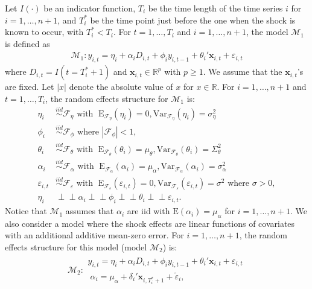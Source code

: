 \documentclass[11pt]{article}
\newcommand{\R}{\mathbb{R}}
\newcommand{\x}{\textbf{x}}
\def\mbf#1{\mathbf{#1}} %
\newcommand{\simiid}{\stackrel{iid}{\sim}} %
\def\where{\text{ where }} %
\newcommand{\indep}{\perp \!\!\! \perp } %
\def\mrm#1{\mathrm{#1}} %
\newcommand{\reals}{\mathbb{R}} %
\def\t#1{\tilde{#1}} %
\def\mc#1{\mathcal{#1}} %
\def\E#1{\mathrm{E}(#1)} %
\theoremstyle{definition}
\begin{document}
Let $I(\cdot)$ be an indicator function, $T_i$ be the time length of the time series $i$ for $i = 1, \ldots, n+1$, and $T_i^*$ be the time point just before the one when the shock is known to occur, with $T_i^* < T_i$.  For $t= 1, \ldots, T_i$ and $i = 1, \ldots, n+1$, the model $\mc{M}_1$ is defined as
\begin{align}
\mc{M}_1 \colon y_{i,t} =\eta_i +\alpha_i D_{i,t} + \phi_i y_{i, t-1} + \theta_i'\mbf{x}_{i,t} + \varepsilon_{i,t}\label{equation1}
\end{align}
 where $D_{i,t} = I(t = T_i^* + 1)$ 
and $\x_{i,t} \in \R^{p}$ with $p \geq 1$.  We assume that the 
$\mbf{x}_{i,t}$'s are fixed. Let $|x|$ denote the absolute value of $x$ for $x\in \reals$. For $i = 1, \ldots, n+1$ and $t=1, \ldots, T_i$, the random effects structure for $\mc{M}_1$ is:
\begin{align*}
  \eta_i &\simiid \mc{F}_{\eta} \text{ with }  \; \mrm{E}_{\mc{F}_{\eta}}(\eta_i) = 0, \mrm{Var}_{\mc{F}_{\eta}}(\eta_i)  = \sigma^2_{\eta}\\
  \phi_i &\simiid \mc{F}_{\phi} \text{ where } |\mc{F}_{\phi}| < 1, \\
   \theta_i &\simiid \mc{F}_{\theta} \text{ with }  \; \mrm{E}_{\mc{F}_{\theta}}(\theta_i) = \mu_{\theta}, \mrm{Var}_{\mc{F}_{\theta}}(\theta_i)  = \Sigma^2_{\theta} \\
\alpha_i &\simiid \mc{F}_{\alpha} \text{ with }  \; \mrm{E}_{\mc{F}_{\alpha}}(\alpha_i) = \mu_{\alpha}, \mrm{Var}_{\mc{F}_{\alpha}}(\alpha_i)  = \sigma^2_{\alpha}  \\
\varepsilon_{i,t} & \simiid  \mc{F}_{\varepsilon} \text{ with }  \; \mrm{E}_{\mc{F}_{\varepsilon}}(\varepsilon_{i,t}) = 0, \mrm{Var}_{\mc{F}_{\varepsilon}}(\varepsilon_{i,t})  = \sigma^2 \where \sigma > 0 ,  \\
\eta_i &\indep  \alpha_i \indep \phi_i \indep \theta_i \indep \varepsilon_{i,t}.
\end{align*}
Notice that $\mc{M}_1$ assumes that $\alpha_i$ are iid with $\E{\alpha_i}=\mu_{\alpha}$ 
for $i = 1, \ldots, n+1$. We also consider a model where the shock effects are linear functions of covariates with an additional additive mean-zero error. For $i = 1, \ldots, n+1$, the random effects structure for this model (model $\mc{M}_2$) is:
\begin{align}
\mc{M}_2 \colon \begin{array}{l}
  y_{i,t} =\eta_i +\alpha_i D_{i,t} + \phi_i y_{i, t-1} + \theta_i'\mbf{x}_{i,t} + \varepsilon_{i,t}\\[.2cm]
  \; \alpha_i = \mu_{\alpha}+\delta_{i}'\mbf{x}_{i, T_i^*+1}+ \t{\varepsilon}_{i},
\end{array}\label{model2}
\end{align}
\end{document}
